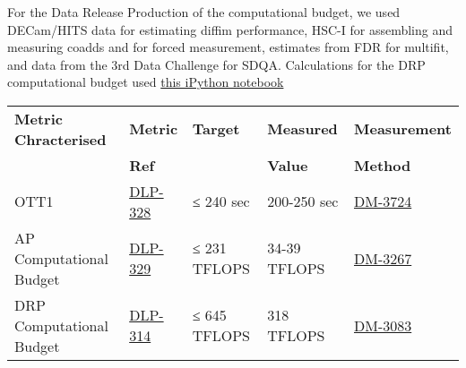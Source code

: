 \documentclass[DM,toc]{lsstdoc}
\begin{document}
For the Data Release Production of the computational budget, we used
DECam/HITS data for estimating diffim performance, HSC-I for assembling
and measuring coadds and for forced measurement, estimates from FDR for
multifit, and data from the 3rd Data Challenge for SDQA. Calculations
for the DRP computational budget used
\href{https://github.com/lsst-dm/kpm/blob/29c053f7b832e8bd999527e012681826fc0c201c/DLP-314:\%20DRP\%20Computational\%20Budget/LSST\%20DRP\%20Computational\%20Budget.ipynb}{this
iPython notebook}

\begin{small}
\begin{longtable}[]{@{}lllll@{}}
\toprule
\textbf{Metric Chracterised} & \textbf{Metric} & \textbf{Target} &
\textbf{Measured} & \textbf{Measurement}\tabularnewline
 & \textbf{Ref} &  &
\textbf{Value} & \textbf{Method}\tabularnewline
\midrule
\endhead
OTT1 & \href{https://jira.lsstcorp.org/browse/DLP-328}{DLP-328} & ≤ 240
sec & 200-250 sec &
\href{https://jira.lsstcorp.org/browse/DM-3724}{DM-3724}\tabularnewline
AP Computational Budget &
\href{https://jira.lsstcorp.org/browse/DLP-329}{DLP-329} & ≤ 231 TFLOPS
& 34-39 TFLOPS &
\href{https://jira.lsstcorp.org/browse/DM-3267}{DM-3267}\tabularnewline
DRP Computational Budget &
\href{https://jira.lsstcorp.org/browse/DLP-314}{DLP-314} & ≤ 645 TFLOPS
& 318 TFLOPS &
\href{https://jira.lsstcorp.org/browse/DM-3083}{DM-3083}\tabularnewline
\bottomrule
\end{longtable}
\end{small}


\end{document}
